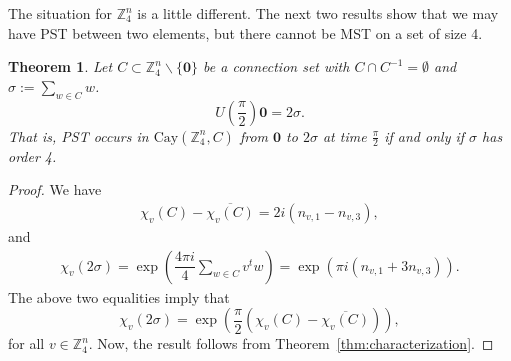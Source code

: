 \documentclass{amsart}
\theoremstyle{plain}
\newtheorem{theorem}{Theorem}[section]
\theoremstyle{remark}\newtheorem{con}[theorem]{Construction}
\theoremstyle{remark} \newtheorem*{remark}{Remark}
\theoremstyle{remark} \newtheorem{example}{Example}
\newcommand{\bb}{\mathbb}
\newcommand{\mrm}{\mathrm}
\newcommand{\mbf}{\mathbf}
\newcommand{\ov}{\overline}
\begin{document}
The situation for $\bb{Z}_4^n$ is a little different.
The next two results show that we may have PST between two elements, but there cannot be MST on a set of size 4.

\begin{theorem}
Let $C \subset \bb{Z}_{4}^{n} \backslash \{\mbf{0}\}$ be a connection set with $C \cap C^{-1}=\emptyset$ and $\sigma:=\sum\limits_{w \in C} w$. \begin{equation*}
    U\left(\frac{\pi}{2}\right) \mbf{0} = 2\sigma.
\end{equation*}
That is, PST occurs in $\mrm{Cay}(\bb{Z}_4^n, C)$ from $\mbf{0}$ to $2\sigma$ at time $\frac{\pi}{2}$ if and only if $\sigma$ has order 4. 
\end{theorem}  
\begin{proof}
We have
\begin{align*}
\chi_{v}(C)-\ov{\chi_{v}(C)} =  2i\left( n_{v,1}-n_{v,3} \right) ,
\end{align*}
and
\begin{align*}
\chi_{v}(2\sigma)  =\exp\left( \dfrac{4\pi i}{4} \sum\limits_{w \in C } v^{t}w \right) 
 = \exp\left( \pi i \left( n_{v,1}+3n_{v,3} \right)  \right). 
\end{align*}
The above two equalities imply that
\[\chi_{v}(2\sigma) = \exp\left( \dfrac{\pi}{2} \left(\chi_{v}(C)-\ov{\chi_{v}(C)}\right) \right),\] 
for all $v \in \bb{Z}_{4}^{n}$. Now, the result follows from Theorem~\ref{thm:characterization}. 
\end{proof}
\end{document}
